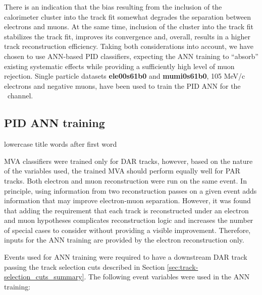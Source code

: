 There is an indication that the bias resulting from the inclusion of the calorimeter cluster
into the track fit somewhat degrades the separation between electrons and muons.
%
At the same time, inclusion of the cluster into the track fit stabilizes the track fit, improves its
convergence and, overall, results in a higher track reconstruction efficiency.
%
Taking both considerations into account,  {\blue we have} chosen to use ANN-based PID classifiers,
expecting the ANN training to ``absorb'' existing systematic effects while providing {\blue a} sufficiently
high level of muon rejection.
Single particle datasets {\bf ele00s61b0} and {\bf mumi0s61b0},  105 MeV/c electrons and
{\blue negative muons},
have been used to train the PID ANN for {\blue the} \MuToEm\ channel.

\subsection {PID ANN training }
\label{sec:mumem_pid_ann_training}
{\blue lowercase title words after first word}

MVA classifiers were trained only for DAR  {\blue tracks}, however{\blue ,} based on the nature of 
the variables used, the trained MVA should perform equally well for PAR tracks.
Both electron and muon reconstruction were  {\blue run} on the same event. 
{\blue In principle, using information from two reconstruction passes on a given event adds information that may improve electron-muon separation.}
However, it was found that adding {\blue the} requirement  {\blue that} each
track  {\blue is} reconstructed under {\blue an} electron and muon hypotheses complicates {\blue reconstruction} logic and increases
the number of special cases to consider without providing a visible improvement. 
Therefore, inputs for the ANN training are provided by the electron reconstruction only.

Events used for ANN training were required to have a downstream DAR track passing
the track selection cuts described in Section \ref{sec:track-selection_cuts_summary}.
%
The following event variables  {\blue were} used in the ANN training:

